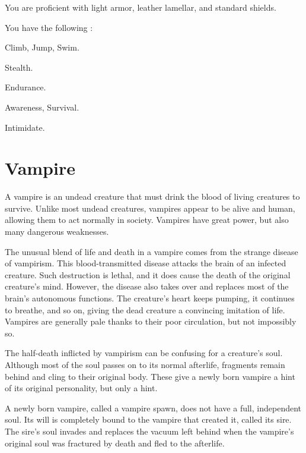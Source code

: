       You are proficient with light armor, leather lamellar, and standard shields.

      You have the following :

      \begin{raggeditemize}
        \item {} Climb, Jump, Swim.
        \item {} Stealth.
        \item {} Endurance.
        \item {} Awareness, Survival.
        \item {} Intimidate.
      \end{raggeditemize}

\section{Vampire}
  A vampire is an undead creature that must drink the blood of living creatures to survive.
  Unlike most undead creatures, vampires appear to be alive and human, allowing them to act normally in society.
  Vampires have great power, but also many dangerous weaknesses.

  The unusual blend of life and death in a vampire comes from the strange disease of vampirism.
  This blood-transmitted disease attacks the brain of an infected creature.
  Such destruction is lethal, and it does cause the death of the original creature's mind.
  However, the disease also takes over and replaces most of the brain's autonomous functions.
  The creature's heart keeps pumping, it continues to breathe, and so on, giving the dead creature a convincing imitation of life.
  Vampires are generally pale thanks to their poor circulation, but not impossibly so.

  The half-death inflicted by vampirism can be confusing for a creature's soul.
  Although most of the soul passes on to its normal afterlife, fragments remain behind and cling to their original body.
  These give a newly born vampire a hint of its original personality, but only a hint.

  A newly born vampire, called a vampire spawn, does not have a full, independent soul.
  Its will is completely bound to the vampire that created it, called its sire.
  The sire's soul invades and replaces the vacuum left behind when the vampire's original soul was fractured by death and fled to the afterlife.

